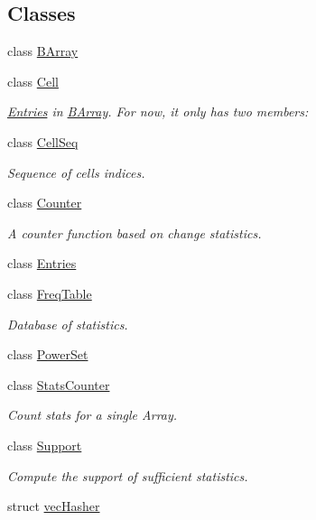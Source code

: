 \subsection*{Classes}
\begin{DoxyCompactItemize}
\item 
class \hyperlink{classbarry_1_1_b_array}{B\+Array}
\item 
class \hyperlink{classbarry_1_1_cell}{Cell}
\begin{DoxyCompactList}\small\item\em \hyperlink{classbarry_1_1_entries}{Entries} in \hyperlink{classbarry_1_1_b_array}{B\+Array}. For now, it only has two members\+: \end{DoxyCompactList}\item 
class \hyperlink{classbarry_1_1_cell_seq}{Cell\+Seq}
\begin{DoxyCompactList}\small\item\em Sequence of cells indices. \end{DoxyCompactList}\item 
class \hyperlink{classbarry_1_1_counter}{Counter}
\begin{DoxyCompactList}\small\item\em A counter function based on change statistics. \end{DoxyCompactList}\item 
class \hyperlink{classbarry_1_1_entries}{Entries}
\item 
class \hyperlink{classbarry_1_1_freq_table}{Freq\+Table}
\begin{DoxyCompactList}\small\item\em Database of statistics. \end{DoxyCompactList}\item 
class \hyperlink{classbarry_1_1_power_set}{Power\+Set}
\item 
class \hyperlink{classbarry_1_1_stats_counter}{Stats\+Counter}
\begin{DoxyCompactList}\small\item\em Count stats for a single Array. \end{DoxyCompactList}\item 
class \hyperlink{classbarry_1_1_support}{Support}
\begin{DoxyCompactList}\small\item\em Compute the support of sufficient statistics. \end{DoxyCompactList}\item 
struct \hyperlink{structbarry_1_1vec_hasher}{vec\+Hasher}
\end{DoxyCompactItemize}
